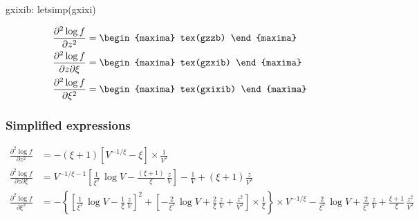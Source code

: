 \begin{maxima}
  gxixib: letsimp(gxixi)
\end{maxima}%

{\color{MonVertF}
\begin{align*}
  \frac{\partial^2 \log f}{\partial z^2}
  &=
  \begin{maxima}
    tex(gzzb)
  \end{maxima}\\
  \frac{\partial^2 \log f}{\partial z \partial \xi}
  &=
  \begin{maxima}
    tex(gzxib)
  \end{maxima}\\
  \frac{\partial^2 \log f}{\partial \xi^2}
  &=
  \begin{maxima}
    tex(gxixib)
  \end{maxima}
\end{align*}
}

\subsubsection*{Simplified expressions}
{\color{red}
\begin{align*}
  \frac{\partial^2 \log f}{\partial z^2}
  &= - (\xi + 1) \left[V^{-1/\xi} - \xi\right] \times \frac{1}{ V^2}\\
  \frac{\partial^2 \log f}{\partial z \partial \xi}
  &=  V^{-1/\xi -1}
    \left[\frac{1}{\xi^2} \,\log V - \frac{(\xi + 1)}{\xi}\,\frac{z}{V} \right]
    - \frac{1}{V} + (\xi +1) \frac{z}{V^2}   \\
  \frac{\partial^2 \log f}{\partial \xi^2} 
  &= - \left\{ \left[\frac{1}{\xi^2} \, \log V - \frac{1}{\xi}\,\frac{z}{V} \right]^2 +
    \left[ - \frac{2}{\xi^2}\,\log V + \frac{2}{\xi}\,\frac{z}{V}
    + \frac{z^2}{V^2}\right] \times
    \frac{1}{\xi} \right\} \times V^{-1/\xi} - \frac{2}{\xi^3}\,\log V +
    \frac{2}{\xi^2}\,\frac{z}{V} + \frac{\xi +1}{\xi}\, \frac{z^2}{V^2}
\end{align*}
}




